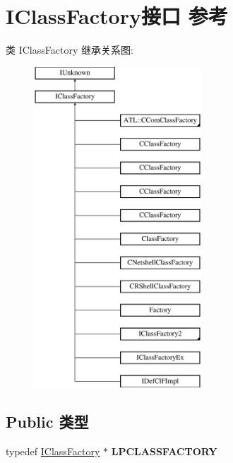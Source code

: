 \hypertarget{interface_i_class_factory}{}\section{I\+Class\+Factory接口 参考}
\label{interface_i_class_factory}
类 I\+Class\+Factory 继承关系图\+:\begin{figure}[H]
\begin{center}
\leavevmode
\includegraphics[height=12.000000cm]{interface_i_class_factory}
\end{center}
\end{figure}
\subsection*{Public 类型}
\begin{DoxyCompactItemize}
\item 
\mbox{\label{interface_i_class_factory_a9dec55e53a4f36d0e496522da5d1f465}} 
typedef \hyperlink{interface_i_class_factory}{I\+Class\+Factory} $\ast$ {\bfseries L\+P\+C\+L\+A\+S\+S\+F\+A\+C\+T\+O\+RY}
\end{DoxyCompactItemize}
